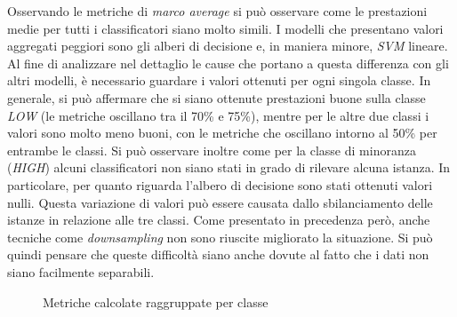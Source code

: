     Osservando le metriche di \textit{marco average} si può osservare come le prestazioni medie per tutti i classificatori siano molto simili. I modelli che presentano valori aggregati peggiori sono gli alberi di decisione e, in maniera minore, \textit{SVM} lineare. 
    Al fine di analizzare nel dettaglio le cause che portano a questa differenza con gli altri modelli, è necessario guardare i valori ottenuti per ogni singola classe. In generale, si può affermare che si siano ottenute prestazioni buone sulla classe \textit{LOW} (le metriche oscillano tra il 70\% e 75\%), mentre per le altre due classi i valori sono molto meno buoni, con le metriche che oscillano intorno al 50\% per entrambe le classi. Si può osservare inoltre come per la classe di minoranza (\textit{HIGH}) alcuni classificatori non siano stati in grado di rilevare alcuna istanza. In particolare, per quanto riguarda l'albero di decisione sono stati ottenuti valori nulli.
    Questa variazione di valori può essere causata dallo sbilanciamento delle istanze in relazione alle tre classi. Come presentato in precedenza però, anche tecniche come \textit{downsampling} non sono riuscite migliorato la situazione. Si può quindi pensare che queste difficoltà siano anche dovute al fatto che i dati non siano facilmente separabili.
    
    \newpage
    
    \begin{figure}[!h]
        \noindent{}
        \centering
        \label{fig:out_metrics}
        \caption{Metriche calcolate raggruppate per classe}
    \end{figure}

